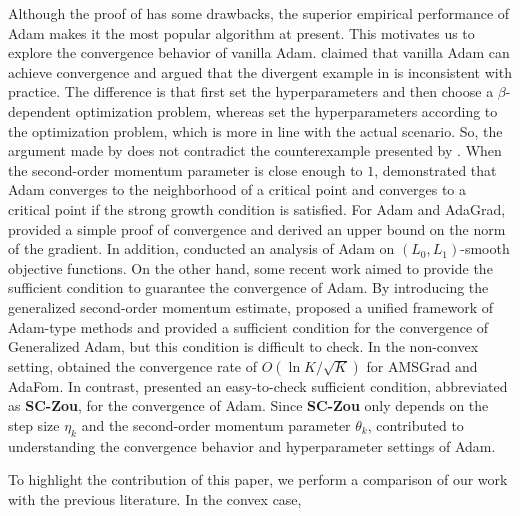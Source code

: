 \documentclass[twoside,11pt]{article}
\begin{document}
\par Although the proof of \citet{kingma2014adam} has some drawbacks, the superior empirical performance of Adam makes it the most popular algorithm at present. This motivates us to explore the convergence behavior of vanilla Adam. \citet{zhang2022adam} claimed that vanilla Adam can achieve convergence and argued that the divergent example in  \citet{reddi2019convergence} is inconsistent with practice. The difference is that \citet{reddi2019convergence} first set the hyperparameters and then choose a $\beta$-dependent optimization problem, whereas \citet{zhang2022adam} set the hyperparameters according to the optimization problem, which is more in line with the actual scenario. So, the argument made by \citet{zhang2022adam} does not contradict the counterexample presented by \citet{reddi2019convergence}. When the second-order momentum parameter is close enough to $1$, \citet{zhang2022adam} demonstrated that Adam converges to the neighborhood of a critical point and converges to a critical point if the strong growth condition is satisfied. For Adam and AdaGrad, \citet{defossezsimple} provided a simple proof of convergence and derived an upper bound on the norm of the gradient. In addition, \citet{wang2022provable} conducted an analysis of Adam on $(L_0,L_1)$-smooth objective functions. On the other hand, some recent work \citep{chen2019convergence,zou2019sufficient} aimed to provide the sufficient condition to guarantee the convergence of Adam. By introducing the generalized second-order momentum estimate, \citet{chen2019convergence} proposed a unified framework of Adam-type methods and provided a sufficient condition for the convergence of Generalized Adam, but this condition is difficult to check. In the non-convex setting, \citet{chen2019convergence} obtained the convergence rate of $O(\ln K/\sqrt{K})$ for AMSGrad and AdaFom. In contrast, \citet{zou2019sufficient} presented an easy-to-check sufficient condition, abbreviated as \textbf{SC-Zou}, for the convergence of Adam. Since \textbf{SC-Zou} only depends on the step size $\eta_{k}$ and the second-order momentum parameter $\theta_ {k}$, \citet{zou2019sufficient} contributed to understanding the convergence behavior and hyperparameter settings of Adam. 
\par To highlight the contribution of this paper, we perform a comparison of our work with the previous literature. In the convex case, 
\end{document}
